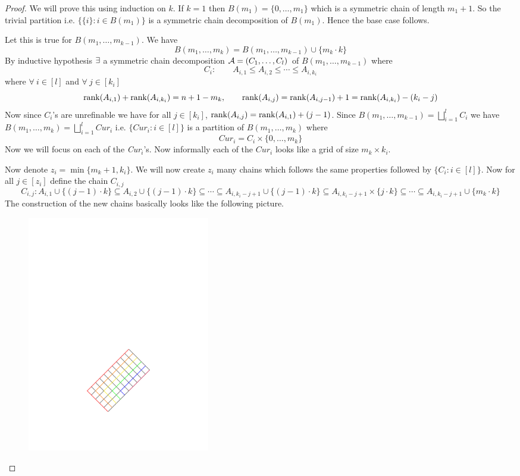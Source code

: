 \begin{proof}
	We will prove this using induction on $k$. If $k=1$ then $B(m_1)=\{0,\dots, m_1\}$ which is a symmetric chain of length $m_1+1$. So the trivial partition i.e. $\{\{i\}\colon i\in B(m_1)\}$ is a symmetric chain decomposition of $B(m_1)$. Hence the base case follows.
	
	Let this is true for $B(m_1,\dots, m_{k-1})$. We have $$B(m_1,\dots, m_{k})=B(m_1,\dots, m_{k-1})\cup\{m_k\cdot k\}$$  By inductive hypothesis $\exists$ a symmetric chain decomposition $\mathcal{A}=(C_1,\dots,C_l)$ of $B(m_1,\dots, m_{k-1})$ where $$C_i:\qquad A_{i,1}\leq A_{i,2}\leq \cdots\leq  A_{i,k_i}$$where $\forall\ i\in[l]$ and $\forall\ j\in[k_i]$ $$\operatorname{rank}(A_{i,1})+\operatorname{rank}(A_{i,k_i})=n+1-m_k,\qquad \operatorname{rank}(A_{i,j})=\operatorname{rank}(A_{i,j-1})+1=\operatorname{rank}(A_{i,k_i})-(k_i-j)$$Now since $C_i$'s are unrefinable we have for all $j\in[k_i]$, $\operatorname{rank}(A_{i,j})=\operatorname{rank}(A_{i,1})+(j-1)$. Since $B(m_1,\dots,m_{k-1})=\bigsqcup\limits_{i=1}^{l}C_i$ we have $B(m_1,\dots, m_k)=\bigsqcup\limits_{i=1}^l\textit{Cur}_i$ i.e. $\{\textit{Cur}_i\colon i\in[l]\}$ is a partition of $B(m_1,\dots,m_k)$ where 
	$$\textit{Cur}_i=C_i\times \{0,\dots, m_k\}$$Now we will focus on each of the \textit{Cur}$_i$'s. Now informally each of the $\textit{Cur}_i$ looks like a grid of size $m_k\times k_i$. 
	
	Now denote $z_i=\min\{m_k+1,k_i\}$. We will now create $z_i$ many chains which follows the same properties followed by $\{C_i\colon i\in[l]\}$. Now for all $j\in [z_i]$ define the chain $C_{i,j}$ 
	$$C_{i,j}\colon  A_{i,1}\cup\{(j-1)\cdot k\}\subseteq  A_{i,2}\cup\{(j-1)\cdot k\}\subseteq  \cdots\subseteq  A_{i,k_i-j+1}\cup\{(j-1)\cdot k\}\subseteq   A_{i,k_i-j+1}\times\{j\cdot k\}\subseteq  \cdots \subseteq  A_{i,k_i-j+1}\cup\{m_k\cdot k\}$$
	The construction of the new chains basically looks like the following picture.
	\begin{figure}[h]
		\centering
		\includegraphics[width=8cm]{images/symchaindecomp.pdf}
	\end{figure}


\end{proof}
